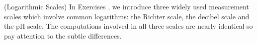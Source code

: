 {\noindent (Logarithmic Scales) In Exercises}
{, we introduce three widely used measurement scales which involve common logarithms: the Richter scale, the decibel scale and the pH scale.  The computations involved in all three scales are nearly identical so pay attention to the subtle differences. \label{logarithmicscales}}
